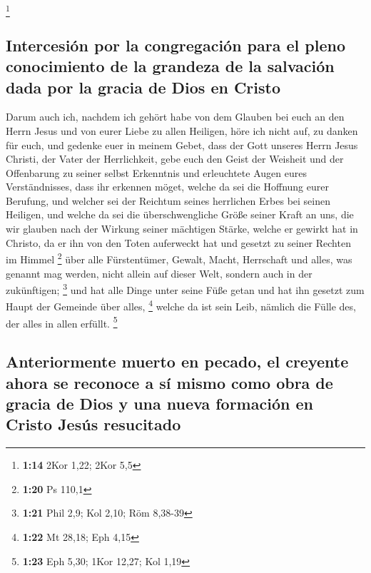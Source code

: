 \footnote{\textbf{1:14} 2Kor 1,22; 2Kor 5,5}

\hypertarget{intercesiuxf3n-por-la-congregaciuxf3n-para-el-pleno-conocimiento-de-la-grandeza-de-la-salvaciuxf3n-dada-por-la-gracia-de-dios-en-cristo}{%
\subsection{Intercesión por la congregación para el pleno conocimiento
de la grandeza de la salvación dada por la gracia de Dios en
Cristo}\label{intercesiuxf3n-por-la-congregaciuxf3n-para-el-pleno-conocimiento-de-la-grandeza-de-la-salvaciuxf3n-dada-por-la-gracia-de-dios-en-cristo}}

 Darum auch ich, nachdem ich gehört habe von dem Glauben
bei euch an den Herrn Jesus und von eurer Liebe zu allen Heiligen,
 höre ich nicht auf, zu danken für euch, und gedenke euer
in meinem Gebet,  dass der Gott unseres Herrn Jesus
Christi, der Vater der Herrlichkeit, gebe euch den Geist der Weisheit
und der Offenbarung zu seiner selbst Erkenntnis  und
erleuchtete Augen eures Verständnisses, dass ihr erkennen möget, welche
da sei die Hoffnung eurer Berufung, und welcher sei der Reichtum seines
herrlichen Erbes bei seinen Heiligen,  und welche da sei
die überschwengliche Größe seiner Kraft an uns, die wir glauben nach der
Wirkung seiner mächtigen Stärke,  welche er gewirkt hat
in Christo, da er ihn von den Toten auferweckt hat und gesetzt zu seiner
Rechten im Himmel \footnote{\textbf{1:20} Ps 110,1}  über
alle Fürstentümer, Gewalt, Macht, Herrschaft und alles, was genannt mag
werden, nicht allein auf dieser Welt, sondern auch in der zukünftigen;
\footnote{\textbf{1:21} Phil 2,9; Kol 2,10; Röm 8,38-39} 
und hat alle Dinge unter seine Füße getan und hat ihn gesetzt zum Haupt
der Gemeinde über alles, \footnote{\textbf{1:22} Mt 28,18; Eph 4,15}
 welche da ist sein Leib, nämlich die Fülle des, der
alles in allen erfüllt. \footnote{\textbf{1:23} Eph 5,30; 1Kor 12,27;
  Kol 1,19}

\hypertarget{anteriormente-muerto-en-pecado-el-creyente-ahora-se-reconoce-a-suxed-mismo-como-obra-de-gracia-de-dios-y-una-nueva-formaciuxf3n-en-cristo-jesuxfas-resucitado}{%
\subsection{Anteriormente muerto en pecado, el creyente ahora se
reconoce a sí mismo como obra de gracia de Dios y una nueva formación en
Cristo Jesús
resucitado}\label{anteriormente-muerto-en-pecado-el-creyente-ahora-se-reconoce-a-suxed-mismo-como-obra-de-gracia-de-dios-y-una-nueva-formaciuxf3n-en-cristo-jesuxfas-resucitado}}

